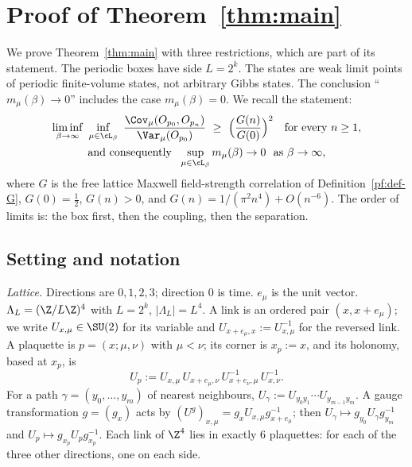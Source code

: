 \section{Proof of Theorem~\ref{thm:main}}\label{sec:proof}

We prove Theorem~\ref{thm:main} with three restrictions, which are part of its statement.
The periodic boxes have side $L=2^k$.
The states are weak limit points of periodic finite-volume states, not arbitrary Gibbs states.
The conclusion ``$m_\mu(\beta)\to0$'' includes the case $m_\mu(\beta)=0$.
We recall the statement:
\begin{equation}\label{pf:eq-main}
\begin{gathered}
\liminf_{\beta\to\infty}\ \inf_{\mu\in\cL_\beta}\ \frac{\Cov_\mu(O_{p_0},O_{p_n})}{\Var_\mu(O_{p_0})}\ \ge\ \Big(\frac{G(n)}{G(0)}\Big)^2\quad\text{for every } n\ge1,\\
\text{and consequently }\ \sup_{\mu\in\cL_\beta}m_\mu(\beta)\to0\ \text{ as }\beta\to\infty,
\end{gathered}
\end{equation}
where $G$ is the free lattice Maxwell field-strength correlation of Definition~\ref{pf:def-G}, $G(0)=\tfrac12$, $G(n)>0$, and $G(n)=1/(\pi^2n^4)+O(n^{-6})$.
The order of limits is: the box first, then the coupling, then the separation.

\subsection{Setting and notation}\label{pf:sec-setting}

\emph{Lattice.} Directions are $0,1,2,3$; direction $0$ is time. $e_\mu$ is the unit vector. $\Lambda_L=(\Z/L\Z)^4$ with $L=2^k$, $|\Lambda_L|=L^4$. A link is an ordered pair $(x,x+e_\mu)$; we write $U_{x,\mu}\in\SU(2)$ for its variable and $U_{x+e_\mu,x}:=U_{x,\mu}^{-1}$ for the reversed link. A plaquette is $p=(x;\mu,\nu)$ with $\mu<\nu$; its corner is $x_p:=x$, and its holonomy, based at $x_p$, is
\[
U_p:=U_{x,\mu}\,U_{x+e_\mu,\nu}\,U_{x+e_\nu,\mu}^{-1}\,U_{x,\nu}^{-1}.
\]
For a path $\gamma=(y_0,\dots,y_m)$ of nearest neighbours, $U_\gamma:=U_{y_0y_1}\cdots U_{y_{m-1}y_m}$.
A gauge transformation $g=(g_x)$ acts by $(U^g)_{x,\mu}=g_xU_{x,\mu}g_{x+e_\mu}^{-1}$; then $U_\gamma\mapsto g_{y_0}U_\gamma g_{y_m}^{-1}$ and $U_p\mapsto g_{x_p}U_pg_{x_p}^{-1}$.
Each link of $\Z^4$ lies in exactly $6$ plaquettes: for each of the three other directions, one on each side.


